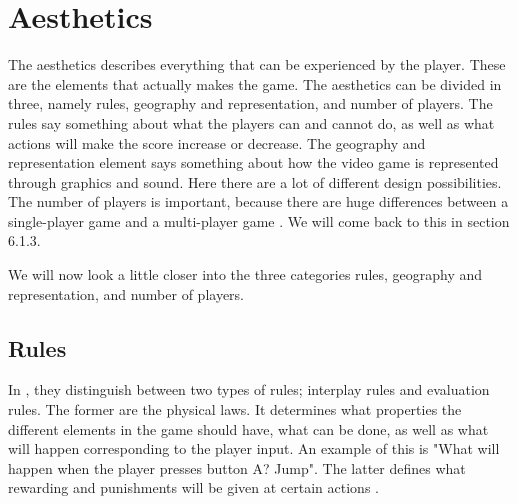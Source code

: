 \section{Aesthetics}
The aesthetics describes everything that can be experienced by the player. These are the elements that actually makes the game. The aesthetics can be divided in three, namely rules, geography and representation, and number of players. The rules say something about what the players can and cannot do, as well as what actions will make the score increase or decrease. The geography and representation element says something about how the video game is represented through graphics and sound. Here there are a lot of different design possibilities. The number of players is important, because there are huge differences between a single-player game and a multi-player game \cite{understandingvg}. We will come back to this in section 6.1.3. 

We will now look a little closer into the three categories rules, geography and representation, and number of players.

\subsection{Rules}
In \cite{understandingvg}, they distinguish between two types of rules; interplay rules and evaluation rules. The former are the physical laws. It determines what properties the different elements in the game should have, what can be done, as well as what will happen corresponding to the player input. An example of this is "What will happen when the player presses button A? Jump". The latter defines what rewarding and punishments will be given at certain actions \cite{understandingvg}. 

